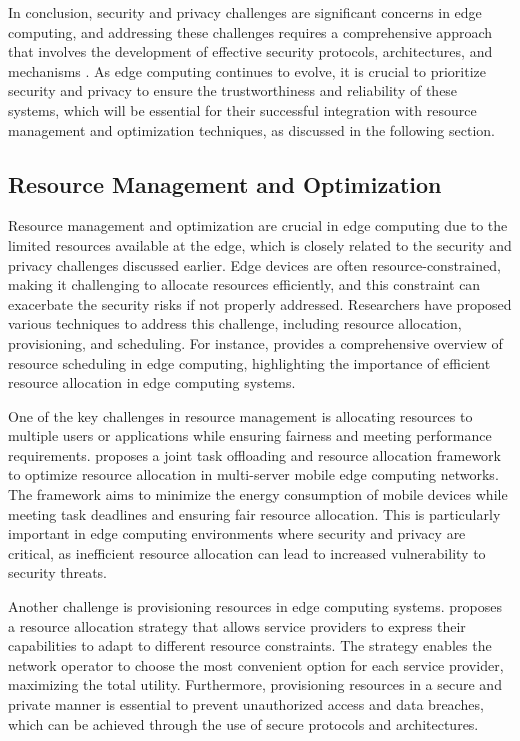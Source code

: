 \documentclass[11pt]{article}
\begin{document}
In conclusion, security and privacy challenges are significant concerns in edge computing, and addressing these challenges requires a comprehensive approach that involves the development of effective security protocols, architectures, and mechanisms \cite{ref14}. As edge computing continues to evolve, it is crucial to prioritize security and privacy to ensure the trustworthiness and reliability of these systems, which will be essential for their successful integration with resource management and optimization techniques, as discussed in the following section.

\subsection{Resource Management and Optimization}

Resource management and optimization are crucial in edge computing due to the limited resources available at the edge, which is closely related to the security and privacy challenges discussed earlier. Edge devices are often resource-constrained, making it challenging to allocate resources efficiently, and this constraint can exacerbate the security risks if not properly addressed. Researchers have proposed various techniques to address this challenge, including resource allocation, provisioning, and scheduling. For instance, \cite{ref71} provides a comprehensive overview of resource scheduling in edge computing, highlighting the importance of efficient resource allocation in edge computing systems.

One of the key challenges in resource management is allocating resources to multiple users or applications while ensuring fairness and meeting performance requirements. \cite{ref72} proposes a joint task offloading and resource allocation framework to optimize resource allocation in multi-server mobile edge computing networks. The framework aims to minimize the energy consumption of mobile devices while meeting task deadlines and ensuring fair resource allocation. This is particularly important in edge computing environments where security and privacy are critical, as inefficient resource allocation can lead to increased vulnerability to security threats.

Another challenge is provisioning resources in edge computing systems. \cite{ref40} proposes a resource allocation strategy that allows service providers to express their capabilities to adapt to different resource constraints. The strategy enables the network operator to choose the most convenient option for each service provider, maximizing the total utility. Furthermore, provisioning resources in a secure and private manner is essential to prevent unauthorized access and data breaches, which can be achieved through the use of secure protocols and architectures.
\end{document}

